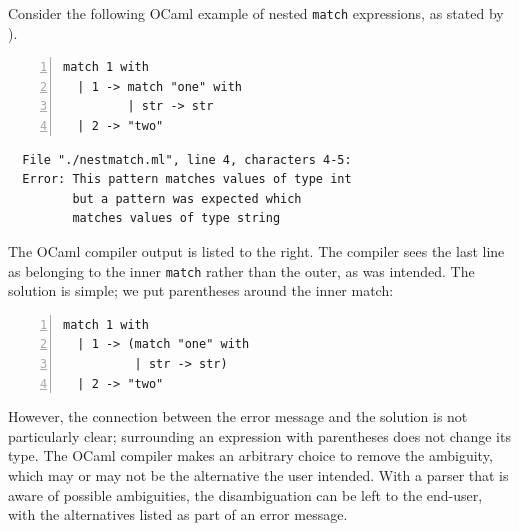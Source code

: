 \documentclass[acmsmall,review,anonymous]{acmart}\settopmatter{printfolios=true,printccs=false,printacmref=false}
\newcommand{\ocaml}{\lstinline[language={[objective]caml}]}
\begin{document}
Consider the following OCaml example of nested \verb|match| expressions, as stated by \cite{palmkvistCreatingDomainSpecificLanguages2019}).

\begin{minipage}{.35\textwidth}
\begin{lstlisting}[language={[objective]caml},numbers=left]
match 1 with
  | 1 -> match "one" with
         | str -> str
  | 2 -> "two"
\end{lstlisting}
\end{minipage}
\vrule
\begin{minipage}{\textwidth}
\begin{lstlisting}
  File "./nestmatch.ml", line 4, characters 4-5:
  Error: This pattern matches values of type int
         but a pattern was expected which
         matches values of type string
\end{lstlisting}
\end{minipage}


\noindent The OCaml compiler output is listed to the right. The compiler sees the last line as belonging to the inner \ocaml{match} rather than the outer, as was intended. The solution is simple; we put parentheses around the inner match:

\begin{minipage}{\textwidth}
\begin{lstlisting}[language={[objective]caml},numbers=left]
match 1 with
  | 1 -> (match "one" with
          | str -> str)
  | 2 -> "two"
\end{lstlisting}
\end{minipage}

\noindent However, the connection between the error message and the solution is not particularly clear; surrounding an expression with parentheses does not change its type.
%
%
%
%
%
%
The OCaml compiler makes an arbitrary choice to remove the ambiguity, which may or may not be the alternative the user intended. With a parser that is aware of possible ambiguities, the disambiguation can be left to the end-user, with the alternatives listed as part of an error message.
\end{document}
